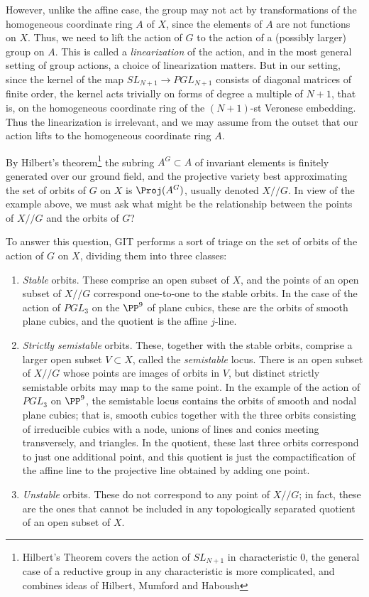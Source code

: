However, unlike the affine case, the group may not act by transformations of the homogeneous coordinate ring $A$ of $X$, since the elements of $A$ are not functions on $X$. Thus, we need to lift the action of 
$G$ to the action of a (possibly larger) group on $A$.  This is called a \emph{linearization} of the action, and in the most general setting of group actions,
a choice of linearization matters.  But in our setting, since the kernel of the map $SL_{N+1} \to PGL_{N+1}$ consists of diagonal matrices of finite order, the kernel acts trivially on forms of degree a multiple
of $N+1$, that is, on the homogeneous coordinate ring of the $(N+1)$-st Veronese embedding. Thus the linearization is irrelevant, and we may assume from the outset that our action lifts to the homogeneous coordinate ring $A$.

By Hilbert's theorem\footnote{Hilbert's Theorem covers the action of $SL_{N+1}$ in characteristic 0, the general case of a reductive group in any characteristic is more complicated, and combines ideas of 
Hilbert, Mumford and Haboush} the subring $A^G \subset A$ of invariant elements is finitely generated over our ground field, and the projective variety best approximating the set of orbits of $G$ on $X$ 
is $\Proj(A^G)$, usually denoted $X//G$. In view of the example above, we must ask what might be
the relationship between the points of $X//G$ and the orbits of $G$? 

To answer this question, GIT performs a sort of triage on the set of orbits of the action of $G$ on $X$, dividing them into three classes:

\begin{enumerate}

\item  \emph{Stable} orbits. These comprise an open subset of $X$, and the points of an open subset of $X//G$ correspond one-to-one to the stable orbits. In the case of the action of $PGL_3$ on the $\PP^9$ of plane cubics, these are the orbits of smooth plane cubics, and the quotient is the affine $j$-line.

\item \emph{Strictly semistable} orbits. These, together with the stable orbits, comprise a larger open subset $V \subset X$, called the \emph{semistable} locus. There is an open subset of
$X//G$ whose points are images of orbits in $V$, but distinct strictly semistable orbits may map to the same point. In the example of the action of $PGL_3$ on  $\PP^9$, the semistable  locus contains  the orbits of smooth and nodal plane cubics; that is, smooth cubics together with the three orbits consisting of irreducible cubics with a node, unions of lines and conics meeting transversely, and triangles. In the quotient, these last three orbits correspond to just one additional point, and this quotient is just the compactification of the affine line to the projective line obtained by adding one point.

\item  \emph{Unstable} orbits. These do not correspond to any point of $X//G$; in fact, these are the ones that cannot be included in any topologically separated quotient of an open subset of $X$.

\end{enumerate}

